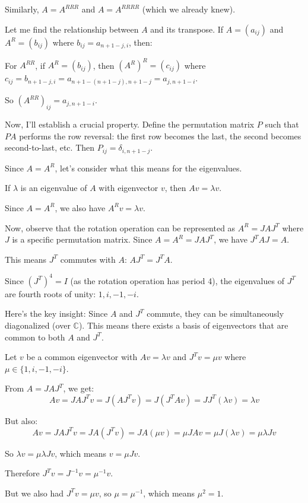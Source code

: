 \documentclass[12pt,a4paper]{article}
\theoremstyle{definition}
\begin{document}
        Similarly, $A = A^{RRR}$ and $A = A^{RRRR}$ (which we already knew).

        Let me find the relationship between $A$ and its transpose. If $A = (a_{ij})$ and $A^R = (b_{ij})$ where $b_{ij} = a_{n+1-j,i}$, then:

        For $A^{RR}$, if $A^R = (b_{ij})$, then $(A^R)^R = (c_{ij})$ where $c_{ij} = b_{n+1-j,i} = a_{n+1-(n+1-j),n+1-j} = a_{j,n+1-i}$.

        So $(A^{RR})_{ij} = a_{j,n+1-i}$.

        Now, I'll establish a crucial property. Define the permutation matrix $P$ such that $PA$ performs the row reversal: the first row becomes the last, the second becomes second-to-last, etc. Then $P_{ij} = \delta_{i,n+1-j}$.

        Since $A = A^R$, let's consider what this means for the eigenvalues.

        If $\lambda$ is an eigenvalue of $A$ with eigenvector $v$, then $Av = \lambda v$.

        Since $A = A^R$, we also have $A^Rv = \lambda v$.

        Now, observe that the rotation operation can be represented as $A^R = JAJ^T$ where $J$ is a specific permutation matrix. Since $A = A^R = JAJ^T$, we have $J^TAJ = A$.

        This means $J^T$ commutes with $A$: $AJ^T = J^TA$.

        Since $(J^T)^4 = I$ (as the rotation operation has period 4), the eigenvalues of $J^T$ are fourth roots of unity: $1, i, -1, -i$.

        Here's the key insight: Since $A$ and $J^T$ commute, they can be simultaneously diagonalized (over $\mathbb{C}$). This means there exists a basis of eigenvectors that are common to both $A$ and $J^T$.

        Let $v$ be a common eigenvector with $Av = \lambda v$ and $J^Tv = \mu v$ where $\mu \in \{1, i, -1, -i\}$.

        From $A = JAJ^T$, we get:
        $$Av = JAJ^Tv = J(AJ^Tv) = J(J^TAv) = JJ^T(\lambda v) = \lambda v$$

        But also:
        $$Av = JAJ^Tv = JA(J^Tv) = JA(\mu v) = \mu JAv = \mu J(\lambda v) = \mu\lambda Jv$$

        So $\lambda v = \mu\lambda Jv$, which means $v = \mu Jv$.

        Therefore $J^Tv = J^{-1}v = \mu^{-1}v$.

        But we also had $J^Tv = \mu v$, so $\mu = \mu^{-1}$, which means $\mu^2 = 1$.
\end{document}
